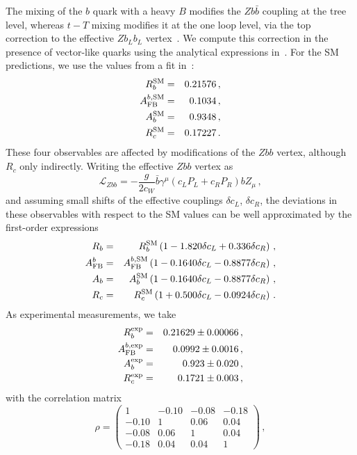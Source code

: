 \documentclass[12pt,a4paper]{article}
\newcommand{\gm}{\gamma^\mu}
\newcommand{\Zm}{Z_{\mu}}
\begin{document}
The mixing of the $b$ quark with a heavy $B$ modifies the $Z b \bar b$ coupling at the tree level, whereas $t-T$ mixing modifies it at the one loop level, via the top correction to the effective $Z b_L b_L$ vertex~\cite{Bernabeu:1987me}. We compute this correction in the presence of vector-like quarks using the analytical expressions in~\cite{Bamert:1996px}. For the SM predictions, we use the values from a fit in~\cite{Beringer:1900zz}:
\begin{eqnarray}
R_b^\text{SM} & = & 0.21576 \,, \notag \\
A_\text{FB}^{b,\text{SM}} & = & 0.1034 \,, \notag \\
A_b^\text{SM} & = & 0.9348 \,, \notag \\
R_c^\text{SM} & = & 0.17227 \,.
\end{eqnarray}
These four observables are affected by modifications of the $Zbb$ vertex, although $R_c$ only indirectly. Writing the effective $Zbb$ vertex as
\begin{equation}
\mathcal{L}_{Zbb} = -\frac{g}{2c_W} \bar b \gm (c_L P_L + c_R P_R) b \Zm \,,
\label{ec:Zbb}
\end{equation}
and assuming small shifts of the effective couplings $\delta c_L$, $\delta c_R$, the deviations in these observables with respect to the SM values can be well approximated by the first-order expressions
\begin{eqnarray}
R_b & = & R_b^\text{SM} \left(1-1.820 \delta c_L + 0.336 \delta c_R \right) \,, \notag \\
A_\text{FB}^b & = & A_\text{FB}^{b,\text{SM}} \left(1- 0.1640 \delta c_L - 0.8877 \delta c_R \right) \,, \notag \\
A_b & = & A_b^\text{SM} \left(1- 0.1640 \delta c_L - 0.8877 \delta c_R \right) \,, \notag \\
R_c & = & R_c^\text{SM} \left(1 + 0.500 \delta c_L - 0.0924 \delta c_R \right) \,.
\end{eqnarray}
As experimental measurements, we take~\cite{ALEPH:2005ab}
\begin{eqnarray}
R_b^\text{exp} & = & 0.21629 \pm 0.00066 \,, \notag \\
A_\text{FB}^{b,\text{exp}} & = & 0.0992 \pm 0.0016 \,, \notag \\
A_b^\text{exp} & = & 0.923 \pm 0.020 \,, \notag \\
R_c^\text{exp} & = & 0.1721 \pm 0.003 \,,
\label{ec:RbX}
\end{eqnarray}
with the correlation matrix
\begin{equation}
\rho = \left( \! \begin{array}{cccc}
1 & -0.10 & -0.08 & -0.18  \\
-0.10 & 1 & 0.06 & 0.04 \\
-0.08 & 0.06 & 1 & 0.04 \\
-0.18 & 0.04 & 0.04 & 1
\end{array}
\! \right) \,,
\end{equation}
\end{document}
